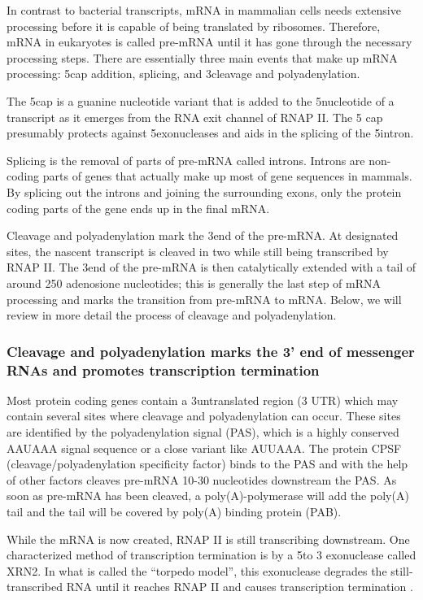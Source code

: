 In contrast to bacterial transcripts, mRNA in mammalian cells needs
extensive processing before it is capable of being translated by ribosomes.
Therefore, mRNA in eukaryotes is called pre-mRNA until it has gone through the
necessary processing steps. There are essentially three main events that make
up mRNA processing: 5\p cap addition, splicing, and 3\p cleavage and
polyadenylation.

The 5\p cap is a guanine nucleotide variant that is added to the 5\p nucleotide
of a transcript as it emerges from the RNA exit channel of RNAP II. The 5\p
cap presumably protects against 5\p exonucleases and aids in the splicing of
the 5\p intron.

Splicing is the removal of parts of pre-mRNA called introns. Introns are
non-coding parts of genes that actually make up most of gene sequences in
mammals. By splicing out the introns and joining the surrounding exons, only
the protein coding parts of the gene ends up in the final mRNA.

Cleavage and polyadenylation mark the 3\p end of the pre-mRNA. At designated
sites, the nascent transcript is cleaved in two while still being transcribed
by RNAP II. The 3\p end of the pre-mRNA is then catalytically extended with a
tail of around 250 adenosione nucleotides; this is generally the last step of
mRNA processing and marks the transition from pre-mRNA to mRNA. Below, we will
review in more detail the process of cleavage and polyadenylation.

\subsubsection{Cleavage and polyadenylation marks the 3' end of messenger RNAs
and promotes transcription termination}
Most protein coding genes contain a 3\p untranslated region (3\p
UTR) which may contain several sites where cleavage and polyadenylation can
occur. These sites are identified by the polyadenylation signal (PAS), which is
a highly conserved AAUAAA signal sequence or a close variant like AUUAAA. The
protein CPSF (cleavage/polyadenylation specificity factor) binds to the PAS and
with the help of other factors cleaves pre-mRNA 10-30 nucleotides downstream
the PAS. As soon as pre-mRNA has been cleaved, a poly(A)-polymerase will add
the poly(A) tail and the tail will be covered by poly(A) binding protein (PAB).

While the mRNA is now created, RNAP II is still transcribing downstream. One
characterized method of transcription termination is by a 5\p to 3\p
exonuclease called XRN2. In what is called the ``torpedo model'', this
exonuclease degrades the still-transcribed RNA until it reaches RNAP II and
causes transcription termination \cite{kuehner_unravelling_2011}.

